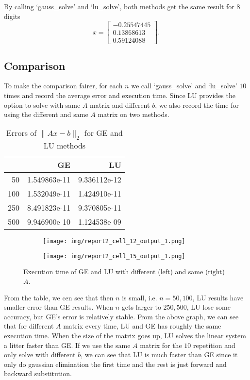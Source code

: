 \documentclass[a4paper,12pt]{article}
\begin{document}
By calling `gauss\_solve' and `lu\_solve',
both methods get the same result for 8 digits
$$
x = \begin{bmatrix}
	-0.25547445  \\
	0.13868613  \\
	0.59124088
\end{bmatrix}.
$$

\subsection{Comparison}
To make the comparison fairer,
for each $n$ we call `gauss\_solve' and `lu\_solve' $10$ times
and record the average error and execution time.
Since LU provides the option to solve with same $A$ matrix and different $b$,
we also record the time for using the different and same $A$ matrix on two methods.

\begin{table}[H]
\begin{center}
	\begin{tabular}{rrr}
	\toprule
	{ } &           GE &           LU \\
	\midrule
	 50 & 1.549863e-11 & 9.336112e-12 \\
	100 & 1.532049e-11 & 1.424910e-11 \\
	250 & 8.491823e-11 & 9.370805e-11 \\
	500 & 9.946900e-10 & 1.124538e-09 \\
	\bottomrule
	\end{tabular}
	\caption{Errors of $\| Ax - b\|_{2}$ for GE and LU methods}
\end{center}
\end{table}


\begin{figure}[H]
    \centering
	\begin{subfigure}[b]{0.49\textwidth}
	    \centering
	    \texttt{[image: img/report2\_cell\_12\_output\_1.png]}
	    \label{fig:0}
	\end{subfigure}
	\hfill
	\begin{subfigure}[b]{0.49\textwidth}
	    \centering
	     \texttt{[image: img/report2\_cell\_15\_output\_1.png]}
	     \label{fig:1}
	\end{subfigure}
	\caption{Execution time of GE and LU with different (left) and same (right) $A$.}
\end{figure}


From the table, we cen see that then $n$ is small, i.e. $n = 50, 100$,
LU results have smaller error than GE results.
When $n$ gets larger to $250, 500$,
LU lose some accuracy, but GE's error is relatively stable.
From the above  graph, we can see that for different $A$ matrix every time,
LU and GE has roughly the same execution time.
When the size of the matrix goes up, LU solves the linear system a litter faster than GE.
If we use the same $A$ matrix for the $10$ repetition and only solve with different $b$,
we can see that LU is much faster than GE
since it only do gaussian elimination the first time and the rest is just forward and backward substitution.
\end{document}

